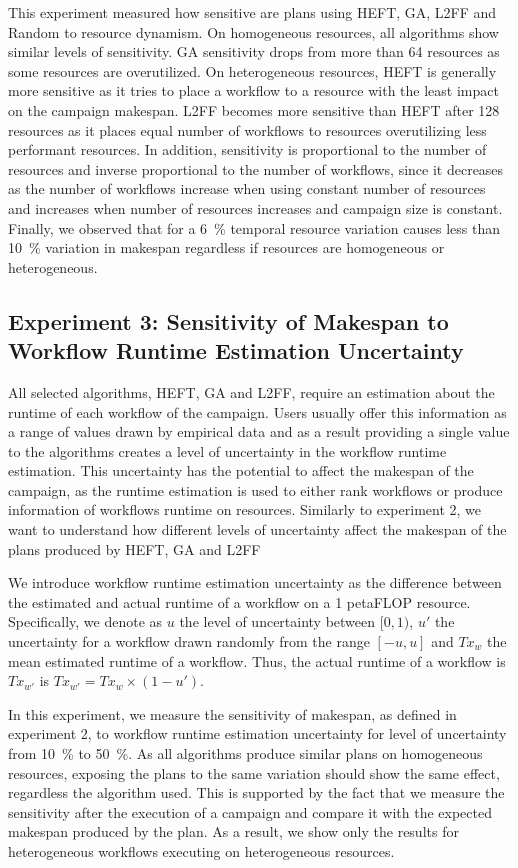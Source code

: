 This experiment measured how sensitive are plans using HEFT, GA, L2FF and 
Random to resource dynamism. On homogeneous resources, all algorithms show 
similar levels of sensitivity. GA sensitivity drops from more than 64 
resources as some resources are overutilized. On heterogeneous resources, HEFT 
is generally more sensitive as it tries to place a workflow to a resource with 
the least impact on the campaign makespan. L2FF becomes more sensitive than 
HEFT after 128 resources as it places equal number of workflows to resources 
overutilizing less performant resources. In addition, sensitivity is 
proportional to the number of resources and inverse proportional to the number 
of workflows, since it decreases as the number of workflows increase when 
using constant number of resources and increases when number of resources 
increases and campaign size is constant. Finally, we observed that for a 6~\% 
temporal resource variation causes less than 10~\% variation in makespan 
regardless if resources are homogeneous or heterogeneous.

\subsection{Experiment 3: Sensitivity of Makespan to Workflow Runtime Estimation Uncertainty}

All selected algorithms, HEFT, GA and L2FF, require an estimation about the 
runtime of each workflow of the campaign. Users usually offer this information 
as a range of values drawn by empirical data and as a result providing a 
single value to the algorithms creates a level of uncertainty in the workflow 
runtime estimation. This uncertainty has the potential to affect the makespan 
of the campaign, as the runtime estimation is used to either rank workflows or 
produce information of workflows runtime on resources. Similarly to experiment 
2, we want to understand how different levels of uncertainty affect the 
makespan of the plans produced by HEFT, GA and L2FF

We introduce workflow runtime estimation uncertainty as the difference between 
the estimated and actual runtime of a workflow on a 1 petaFLOP resource.
Specifically, we denote as $u$ the level of uncertainty between $[0,1)$, $u'$ 
the uncertainty for a workflow drawn randomly from the range $[-u,u]$ and 
$Tx_{w}$ the mean estimated runtime of a workflow. Thus, the actual runtime of 
a workflow is $Tx_{w'}$ is $ Tx_{w'} = Tx_{w} \times (1-u')$.

In this experiment, we measure the sensitivity of makespan, as defined in 
experiment 2, to workflow runtime estimation uncertainty for level of 
uncertainty from 10~\% to 50~\%. As all algorithms produce similar plans on 
homogeneous resources, exposing the plans to the same variation should show 
the same effect, regardless the algorithm used. This is supported by the fact 
that we measure the sensitivity after the execution of a campaign and compare 
it with the expected makespan produced by the plan. As a result, we show only 
the results for heterogeneous workflows executing on heterogeneous resources.


